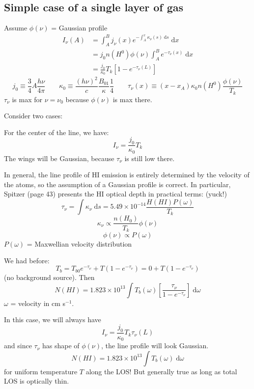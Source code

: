 \documentclass[11pt]{article}
\newcommand{\mar}[1]{\hspace{0pt}\marginpar{-\textcolor{black}{#1}-}}
\begin{document}
\subsection{Simple case of a single layer of gas}
Assume $\phi(\nu)$ = Gaussian profile
\begin{align*}
    I_{\nu} (A)
    &= \int_{A}^{B}{
        j_{\nu} (x) e^{-\int_{A}^{x} \kappa_{\nu} (s) \;\mathrm{d}s}\;\mathrm{d}x}
    \\ &= j_{0} n(H^{0}) \phi(\nu) \int_{A}^{B}{
        e^{-\tau_{\nu}(x)}\;\mathrm{d}x}
    \\ &= \frac{j_{0}}{\kappa_{0}} T_{k} \left[ 1 - e^{-\tau_{\nu}(L)} \right]
\end{align*}
\[
    j_{0} \equiv \frac{3}{4} A \frac{h\nu}{4\pi}
    \qquad
    \kappa_{0} \equiv \frac{(h\nu)^{2}}{c} \frac{B_{01}}{\kappa} \frac{1}{4}
    \qquad
    \tau_{\nu}(x) \equiv (x - x_{A}) \kappa_{0} n(H^{0}) \frac{\phi(\nu)}{T_{k}}
    \]
\[
    \]
$\tau_{\nu}$ is max for $\nu = \nu_{0}$ because $\phi(\nu)$ is max there.

\mar{39}Consider two cases:
\begin{description}[itemsep=1ex, style=nextline] %
    \item [(i) Optically thick: $\tau_{\nu_{o}}(L) \gg 1$]
        For the center of the line, we have:
        \[
            I_{\nu} = \frac{j_{0}}{\kappa_{0}} T_{k}
            \]
        The wings will be Gaussian, because $\tau_{\nu}$ is still low there.

        In general, the line profile of HI emission is entirely determined by the
        velocity of the atoms, so the assumption of a Gaussian profile is correct.
        In particular, Spitzer (page 43) presents the HI optical depth in practical
        terms: (yuck!)
        \[
            \tau_{\nu} = \int{ \kappa_{\nu} \;\mathrm{d}s }
            = 5.49 \times 10^{-14} \frac{H(HI) P(\omega)}{T_{k}}
            \]
        \[
            \kappa_{\nu} \propto \frac{n(H_{0})}{T_{k}} \phi(\nu)
            \]
        \[
            \phi(\nu) \propto P(\omega)
            \]
        $P(\omega)$ = Maxwellian velocity distribution

        \mar{40}We had before:
        \[
            T_{b} = T_{b0} e^{-\tau_{\nu}} + T (1 - e^{-\tau_{\nu}} )
            = 0 + T (1 - e^{-\tau_{\nu}} )
            \]
        (no background source). Then
        \[
            N(HI) = 1.823 \times 10^{13} \int{ T_{b} (\omega) \left[
                \frac{\tau_{\nu}}{1 - e^{-\tau_{\nu}}} \right]
            \;\mathrm{d}\omega}
            \]
        $\omega$ = velocity in cm s$^{-1}$.
    \item [(ii) Optically thin: $\tau_{\nu_{o}}(L) \ll 1$]
        In this case, we will always have
        \[
            I_{\nu} = \frac{j_{0}}{\kappa_{0}} T_{k} \tau_{\nu}(L)
            \]
        and since $\tau_{\nu}$ has shape of $\phi(\nu)$, the line profile will
        look Gaussian.
        \[
            N(HI) = 1.823 \times 10^{13} \int{ T_{b} (\omega)
            \;\mathrm{d}\omega}
            \]
        for uniform temperature $T$ along the LOS! But generally true
        as long as total LOS is optically thin.
\end{description}
\end{document}
